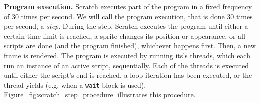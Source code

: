 \textbf{Program execution.}
Scratch executes part of the program in a fixed frequency of 30 times per second.
We will call the program execution, that is done 30 times per second, a \textit{step}.
During the step, Scratch executes the program until either a certain time limit is reached,
a sprite changes its position or appearance, or all scripts are done (and the program finished), whichever happens first.
Then, a new frame is rendered.
The program is executed by running its's threads, which each run an instance of an active script, sequentially.
Each of the threads is executed until either the script's end is reached,
a loop iteration has been executed, or the thread yields (e.g. when a \texttt{wait} block is used).
Figure~\ref{fig:scratch_step_procedure} illustrates this procedure.
\parspace

